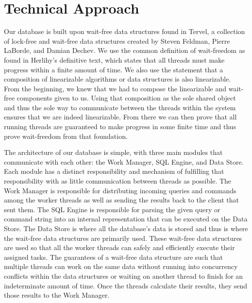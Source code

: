\documentclass[conference, compsoc]{IEEEtran}
\begin{document}
\section{Technical Approach}
Our database is built upon wait-free data structures found in Tervel, a collection of
lock-free and wait-free data structures created by Steven Feldman, Pierre LaBorde, and Damian Dechev\cite{tervel:hazard_pointer}\cite{tervel:hash_map}\cite{tervel:vector}. 
We use the common definition of wait-freedom as found in Herlihy's definitive text, which
states that all threads must make progress within a finite amount of time\cite{herlihy:waitfree}.
We also use the statement that a composition of linearizable algorithms or data structures
is also linearizable. From the beginning, we knew that we had to compose 
the linearizable and wait-free components given to us. Using that composition 
as the sole shared object and thus the sole way to communicate 
between the threads within the system ensures that we are indeed linearizable.
From there we can then prove that all running threads are guaranteed 
to make progress in some finite time and thus prove wait-freedom from that foundation.
\par\vspace{\baselineskip}
The architecture of our database is simple, with three main modules that 
communicate with each other: the Work Manager, SQL Engine, and Data Store.
Each module has a distinct responsibility and mechanism of fulfilling that responsibility with as 
little communication between threads as possible. The Work Manager is responsible for distributing
incoming queries and commands among the worker threads as well as sending the results back to the 
client that sent them. The SQL Engine is responsible for parsing the
given query or command string into an internal representation that can be executed on the Data Store.
The Data Store is where all the database's data is stored and thus is where the wait-free data
structures are primarily used. These wait-free data structures are used so that all
the worker threads can safely and efficiently execute their assigned tasks. The guarantees of a 
wait-free data structure are such that multiple threads can work on the same data without 
running into concurrency conflicts within the data structures or waiting on another thread to 
finish for an indeterminate amount of time. Once the threads calculate their results, they 
send those results to the Work Manager.
\par\vspace{\baselineskip}
\end{document}
